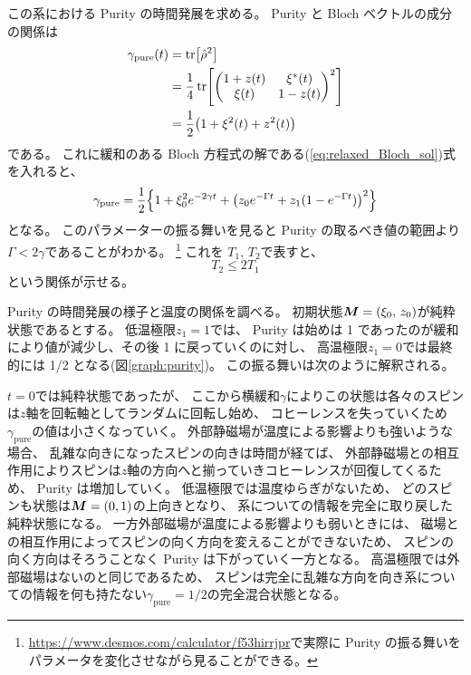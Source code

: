 \documentclass[11pt,dvipdfmx,a4paper]{jsarticle}
\begin{document}
この系における Purity の時間発展を求める。
Purity と Bloch ベクトルの成分の関係は
\begin{align}
	\gamma_{\text{pure}}(t) &= \tr[\hat{\rho}^2] \notag\\
	&=\frac{1}{4}\tr[
		\begin{pmatrix}
			1 + z(t) & \xi^*(t)\\
			\xi(t) & 1 - z(t)
		\end{pmatrix}^2]\notag\\
	&=\frac{1}{2}\qty(1+\xi^2(t)+z^2(t)) \notag\\
\end{align}
である。
これに緩和のある Bloch 方程式の解である(\ref{eq:relaxed_Bloch_sol})式を入れると、
\begin{equation}
	\gamma_{\text{pure}} = \frac{1}{2}\Bigl\{1+\xi_0^2e^{-2\gamma t}+\qty(z_0 e^{-\Gamma t} + z_{1}(1-e^{-\Gamma t}))^2\Bigr\}
\end{equation}
となる。
このパラメーターの振る舞いを見ると Purity の取るべき値の範囲より\(\Gamma < 2\gamma\)であることがわかる。
\footnote{\url{https://www.desmos.com/calculator/f53hirrjpr}で実際に Purity の振る舞いをパラメータを変化させながら見ることができる。}
これを \(T_1 ,\,T_2\)で表すと、
\begin{equation}
	T_2 \le 2T_1
\end{equation}
という関係が示せる。

Purity の時間発展の様子と温度の関係を調べる。
初期状態\(\vb*{M}=(\xi_0,\,z_0)\)が純粋状態であるとする。
低温極限\(z_{1}=1\)では、
Purity は始めは 1 であったのが緩和により値が減少し、その後 1 に戻っていくのに対し、
高温極限\(z_{1}=0\)では最終的には 1/2 となる(図\ref{graph:purity})。
この振る舞いは次のように解釈される。

\(t=0\)では純粋状態であったが、
ここから横緩和\(\gamma\)によりこの状態は各々のスピンは\(z\)軸を回転軸としてランダムに回転し始め、
コヒーレンスを失っていくため\(\gamma_{\text{pure}}\)の値は小さくなっていく。
外部静磁場が温度による影響よりも強いような場合、
乱雑な向きになったスピンの向きは時間が経てば、
外部静磁場との相互作用によりスピンは\(z\)軸の方向へと揃っていきコヒーレンスが回復してくるため、
Purity は増加していく。
低温極限では温度ゆらぎがないため、
どのスピンも状態は\(\vb*{M}=(0,1)\)の上向きとなり、
系についての情報を完全に取り戻した純粋状態になる。
一方外部磁場が温度による影響よりも弱いときには、
磁場との相互作用によってスピンの向く方向を変えることができないため、
スピンの向く方向はそろうことなく Purity は下がっていく一方となる。
高温極限では外部磁場はないのと同じであるため、
スピンは完全に乱雑な方向を向き系についての情報を何も持たない\(\gamma_{\text{pure}}=1/2\)の完全混合状態となる。
\end{document}
